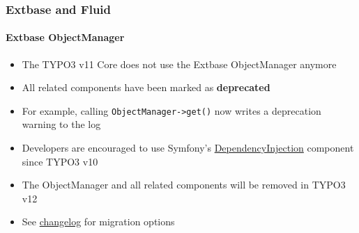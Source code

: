 %

\begin{frame}[fragile]
	\frametitle{Extbase and Fluid}
	\framesubtitle{Extbase ObjectManager}


	\begin{itemize}
		\item The TYPO3 v11 Core does not use the Extbase ObjectManager anymore
		\item All related components have been marked as \textbf{deprecated}
		\item For example, calling \texttt{ObjectManager->get()} now writes
			a deprecation warning to the log
		\item Developers are encouraged to use Symfony's
			\href{https://docs.typo3.org/m/typo3/reference-coreapi/master/en-us/ApiOverview/DependencyInjection/Index.html}{DependencyInjection}
			component since TYPO3 v10
		\item The ObjectManager and all related components will be removed in TYPO3 v12
		\item See
			\href{https://docs.typo3.org/c/typo3/cms-core/master/en-us/Changelog/10.4/Deprecation-90803-DeprecationOfObjectManagergetInExtbaseContext.html#changelog-deprecation-90803-objectmanagerget}{changelog}
			for migration options
	\end{itemize}

\end{frame}

